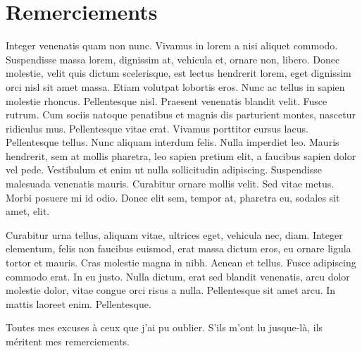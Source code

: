 \documentclass[../these.tex]{subfiles}
\begin{document}
\chapter*{Remerciements}

Integer venenatis quam non nunc. Vivamus in lorem a nisi aliquet commodo.
Suspendisse massa lorem, dignissim at, vehicula et, ornare non, libero. Donec
molestie, velit quis dictum scelerisque, est lectus hendrerit lorem, eget
dignissim orci nisl sit amet massa. Etiam volutpat lobortis eros. Nunc ac
tellus in sapien molestie rhoncus. Pellentesque nisl. Praesent venenatis
blandit velit. Fusce rutrum. Cum sociis natoque penatibus et magnis dis
parturient montes, nascetur ridiculus mus. Pellentesque vitae erat. Vivamus
porttitor cursus lacus. Pellentesque tellus. Nunc aliquam interdum felis.
Nulla imperdiet leo. Mauris hendrerit, sem at mollis pharetra, leo sapien
pretium elit, a faucibus sapien dolor vel pede. Vestibulum et enim ut nulla
sollicitudin adipiscing. Suspendisse malesuada venenatis mauris. Curabitur
ornare mollis velit. Sed vitae metus. Morbi posuere mi id odio. Donec elit
sem, tempor at, pharetra eu, sodales sit amet, elit.

Curabitur urna tellus, aliquam vitae, ultrices eget, vehicula nec, diam.
Integer elementum, felis non faucibus euismod, erat massa dictum eros, eu
ornare ligula tortor et mauris. Cras molestie magna in nibh. Aenean et
tellus. Fusce adipiscing commodo erat. In eu justo. Nulla dictum, erat sed
blandit venenatis, arcu dolor molestie dolor, vitae congue orci risus a
nulla. Pellentesque sit amet arcu. In mattis laoreet enim. Pellentesque.


\medskip

Toutes mes excuses à ceux que j'ai pu oublier. S'ils m'ont lu jusque-là, ils
méritent mes remerciements.
\end{document}

